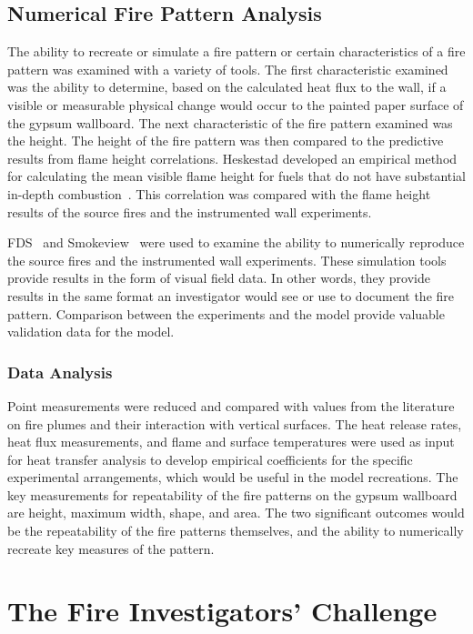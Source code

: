 \documentclass[twoside]{uocthesis}
\begin{document}
{\subsection{Numerical Fire Pattern Analysis}
{}
The ability to recreate or simulate a fire pattern or certain characteristics of a fire pattern was examined with a variety of tools.  The first characteristic examined was the ability to determine, based on the calculated heat flux to the wall, if a visible or measurable physical change would occur to the painted paper surface of the gypsum wallboard.  The next characteristic of the fire pattern examined was the height.  The height of the fire pattern was then compared to the predictive results from flame height correlations. Heskestad developed an empirical method for calculating the mean visible flame height for fuels that do not have substantial in-depth combustion~\cite{Beyler:1986,Heskestad:SFPE}. This correlation was compared with the flame height results of the source fires and the instrumented wall experiments.

FDS~\cite{FDS_Users_Guide} and Smokeview~\cite{Smokeview_Users_Guide} were used to examine the ability to numerically reproduce the source fires and the instrumented wall experiments. These simulation tools provide results in the form of visual field data.  In other words, they provide results in the same format an investigator would see or use to document the fire pattern.  Comparison between the experiments and the model provide valuable validation data for the model.

\subsubsection{Data Analysis}

Point measurements were reduced and compared with values from the literature on fire plumes and their interaction with vertical surfaces.  The heat release rates, heat flux measurements, and flame and surface temperatures were used as input for heat transfer analysis to develop empirical coefficients for the specific experimental arrangements, which would be useful in the model recreations.
The key measurements for repeatability of the fire patterns on the gypsum wallboard are height, maximum width, shape, and area.  The two significant outcomes would be the repeatability of the fire patterns themselves, and the ability to numerically recreate key measures of the pattern.

\section{The Fire Investigators' Challenge}

}
\end{document}
